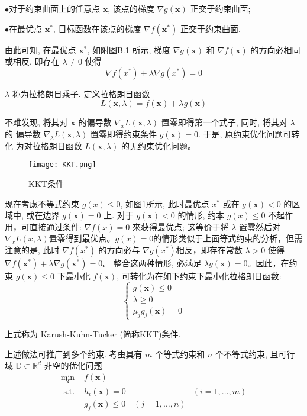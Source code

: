 $\bullet$对于约束曲面上的任意点 $\boldsymbol{x}$, 该点的梯度 $\nabla g(\boldsymbol{x})$ 正交于约束曲面;

$\bullet$在最优点 $\boldsymbol{x}^{*}$, 目标函数在该点的梯度 $\nabla f\left(\boldsymbol{x}^{*}\right)$ 正交于约束曲面.

由此可知, 在最优点 $\boldsymbol{x}^{*}$, 如附图B.1 所示, 梯度 $\nabla g(\boldsymbol{x})$ 和 $\nabla f(\boldsymbol{x})$ 的方向必相同 或相反, 即存在 $\lambda \neq 0$ 使得
$$
\nabla f\left(x^{*}\right)+\lambda \nabla g\left(x^{*}\right)=0
$$

$\lambda$ 称为拉格朗日乘子. 定义拉格朗日函数
$$
L(\boldsymbol{x}, \lambda)=f(\boldsymbol{x})+\lambda g(\boldsymbol{x})
$$

不难发现, 将其对 $\boldsymbol{x}$ 的偏导数 $\nabla_{x} L(\boldsymbol{x}, \lambda)$ 置零即得第一个式子, 同时, 将其对 $\lambda$ 的 偏导数 $\nabla_{\lambda} L(\boldsymbol{x}, \lambda)$ 置零即得约束条件 $g(\boldsymbol{x})=0$. 于是, 原约束优化问题可转化 为对拉格朗日函数 $L(\boldsymbol{x}, \lambda)$ 的无约束优化问题。
\begin{figure}[hbt]
    \centering
    \texttt{[image: KKT.png]}
    \caption{KKT条件}
    \label{KKT}
\end{figure}

现在考虑不等式约束 $g(x) \leqslant 0$, 如图\ref{KKT}所示, 此时最优点 $x^{*}$ 或在 $g(\boldsymbol{x})<0$ 的区域中, 或在边界 $g(\boldsymbol{x})=0$ 上. 对于 $g(\boldsymbol{x})<0$ 的情形, 约本 $g(x) \leqslant 0$ 不起作用，可直接通过条件: $\nabla f(x)=0$ 來获得最优点; 这等价于将 $\lambda$ 置零然后对$\nabla_{x}L(x,\lambda)$置零得到最优点。$g(x)=0$的情形类似于上面等式约束的分析，但需注意的是, 此时 $\nabla f\left(x^{*}\right)$ 的方向必与 $\nabla g\left(x^{*}\right)$相反，即存在常数 $\lambda>0$ 使得 $\nabla f\left(\boldsymbol{x}^{*}\right)+\lambda \nabla g\left(\boldsymbol{x}^{*}\right)=0$。 整合这两种情形, 必满足 $\lambda g(\boldsymbol{x})=0$。因此，在约束 $g(\boldsymbol{x}) \leqslant 0$ 下最小化 $f(\boldsymbol{x})$, 可转化为在如下约束下最小化拉格朗日函数:
$$
\left\{\begin{array}{l}
g(\boldsymbol{x}) \leqslant 0 \\
\lambda \geqslant 0 \\
\mu_{j} g_{j}(\boldsymbol{x})=0
\end{array}\right.
$$

上式称为 Karush-Kuhn-Tucker (简称KKT)条件.

上述做法可推广到多个约束. 考虫具有 $m$ 个等式约束和 $n$ 个不等式约束, 且可行域 $\mathbb{D} \subset \mathbb{R}^{d}$ 非空的优化问题
$$
\begin{array}{lll}
\min _{\boldsymbol{x}} & f(\boldsymbol{x}) & \\
\text { s.t. } & h_{i}(\boldsymbol{x})=0 & (i=1, \ldots, m) \\
& g_{j}(\boldsymbol{x}) \leqslant 0 \quad(j=1, \ldots, n)
\end{array}
$$

